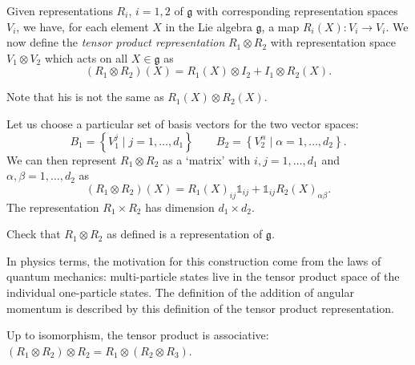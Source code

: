 \begin{definition}[]
  \label{def:tensor-product-rep}
  Given representations $R_i$, $i = 1, 2$ of $\mathfrak{g}$ with corresponding representation spaces $V_i$, we have, for each element $X$ in the Lie algebra $\mathfrak{g}$, a map $R_i(X) \colon V_i \to V_i$.
  We now define the \emph{tensor product representation} $R_1 \otimes R_2$ with representation space $V_1 \otimes V_2$ which acts on all $X \in \mathfrak{g}$ as
  \begin{equation}
    (R_1 \otimes R_2)(X) = R_1(X) \otimes I_2 + I_1 \otimes R_2(X).
  \end{equation}
\end{definition}
\begin{leftbar}
  \begin{remark}
    Note that his is not the same as $R_1(X) \otimes R_2(X)$.
  \end{remark}
\end{leftbar}
Let us choose a particular set of basis vectors for the two vector spaces:
\begin{equation}
  B_1 = \left\{ V_1^j \mid j = 1, \dots , d_1 \right\} \qquad B_2 = \left\{ V_2^\alpha \mid \alpha = 1 ,\dots, d_2 \right\}.
\end{equation}
We can then represent $R_1 \otimes R_2$ as a `matrix' with $i, j = 1 , \dots, d_1$ and $\alpha, \beta = 1, \dots, d_2$ as
\begin{equation}
  (R_1 \otimes R_2)(X) = R_1(X)_{ij} \mathbb{1}_{ij} + \mathbb{1}_{ij} R_2(X)_{\alpha\beta}.
\end{equation}
The representation $R_1 \times R_2$ has dimension $d_1 \times d_2$.

\begin{exercise}
  Check that $R_1 \otimes R_2$ as defined is a representation of $\mathfrak{g}$.
\end{exercise}

\begin{leftbar}
  \begin{remark}
    In physics terms, the motivation for this construction come from the laws of quantum mechanics: multi-particle states live in the tensor product space of the individual one-particle states.
    The definition of the addition of angular momentum is described by this definition of the tensor product representation.
  \end{remark}
\end{leftbar}
\begin{leftbar}
  \begin{remark}
    Up to isomorphism, the tensor product is associative: $(R_1 \otimes R_2) \otimes R_2 = R_1 \otimes (R_2 \otimes R_3)$.
  \end{remark}
\end{leftbar}

